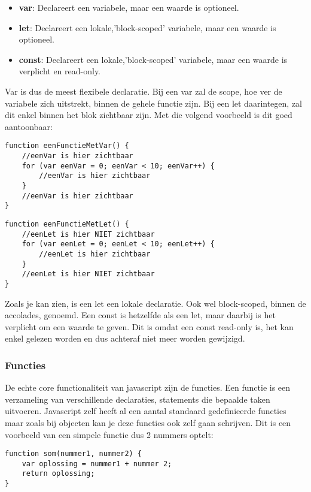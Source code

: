 \begin{itemize}
	\item \textbf{var}: Declareert een variabele, maar een waarde is optioneel.
	\item \textbf{let}: Declareert een lokale,'block-scoped' variabele, maar een waarde is optioneel.
	\item \textbf{const}: Declareert een lokale,'block-scoped' variabele, maar een waarde is verplicht en read-only.
\end{itemize}

Var is dus de meest flexibele declaratie. Bij een var zal de scope, hoe ver de variabele zich uitstrekt, binnen de gehele functie zijn. Bij een let daarintegen, zal dit enkel binnen het blok zichtbaar zijn. Met die volgend voorbeeld is dit goed aantoonbaar:

\begin{lstlisting}[frame=single]
function eenFunctieMetVar() {
	//eenVar is hier zichtbaar
	for (var eenVar = 0; eenVar < 10; eenVar++) {
		//eenVar is hier zichtbaar
	}
	//eenVar is hier zichtbaar
}
\end{lstlisting}

\begin{lstlisting}[frame=single]
function eenFunctieMetLet() {
	//eenLet is hier NIET zichtbaar
	for (var eenLet = 0; eenLet < 10; eenLet++) {
		//eenLet is hier zichtbaar
	}
	//eenLet is hier NIET zichtbaar
}
\end{lstlisting}

Zoals je kan zien, is een let een lokale declaratie. Ook wel block-scoped, binnen de accolades, genoemd. Een const is hetzelfde als een let, maar daarbij is het verplicht om een waarde te geven. Dit is omdat een const read-only is, het kan enkel gelezen worden en dus achteraf niet meer worden gewijzigd.

\subsubsection{Functies}
\label{sssec:functies}
De echte core functionaliteit van javascript zijn de functies. Een functie is een verzameling van verschillende declaraties, statements die bepaalde taken uitvoeren. Javascript zelf heeft al een aantal standaard gedefinieerde functies maar zoals bij objecten kan je deze functies ook zelf gaan schrijven. Dit is een voorbeeld van een simpele functie dus 2 nummers optelt:

\begin{lstlisting}[frame=single]
function som(nummer1, nummer2) {
	var oplossing = nummer1 + nummer 2;
	return oplossing;
}
\end{lstlisting}

